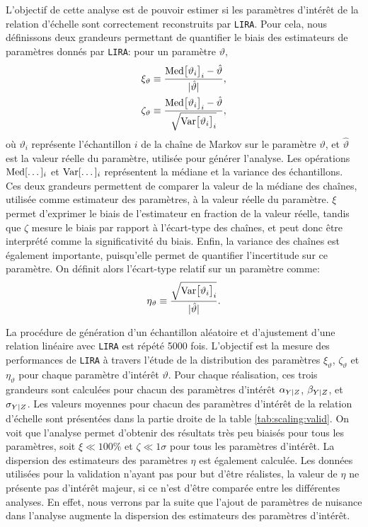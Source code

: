 L'objectif de cette analyse est de pouvoir estimer si les paramètres d'intérêt de la relation d'échelle sont correctement reconstruits par \texttt{LIRA}.
Pour cela, nous définissons deux grandeurs permettant de quantifier le biais des estimateurs de paramètres donnés par \texttt{LIRA}: pour un paramètre $\vartheta$,
\begin{align}
    \nonumber \xi_\vartheta &\equiv \frac{{\rm Med} \big[\vartheta_i\big]_i - \hat{\vartheta}}{|\hat{\vartheta}|}, \\
    \zeta_\vartheta &\equiv \frac{{\rm Med} \big[\vartheta_i\big]_i - \hat{\vartheta}}{\sqrt{{\rm Var}\big[\vartheta_i\big]_i}},
    \label{eq:scaling:xi_zeta}
\end{align}
où $\vartheta_i$ représente l'échantillon $i$ de la chaîne de Markov sur le paramètre $\vartheta$, et $\hat{\vartheta}$ est la valeur réelle du paramètre, utilisée pour générer l'analyse.
Les opérations ${\rm Med}[\dots]_i$ et ${\rm Var}[\dots]_i$ représentent la médiane et la variance des échantillons. \\
Ces deux grandeurs permettent de comparer la valeur de la médiane des chaînes, utilisée comme estimateur des paramètres, à la valeur réelle du paramètre.
$\xi$ permet d'exprimer le biais de l'estimateur en fraction de la valeur réelle, tandis que $\zeta$ mesure le biais par rapport à l'écart-type des chaînes, et peut donc être interprété comme la significativité du biais.
Enfin, la variance des chaînes est également importante, puisqu'elle permet de quantifier l'incertitude sur ce paramètre.
On définit alors l'écart-type relatif sur un paramètre comme:
\begin{equation}
    \label{eq:scaling:eta}
    \eta_\vartheta \equiv \frac{\sqrt{{\rm Var}\big[\vartheta_i\big]_i}}{|\hat{\vartheta}|}.
\end{equation}

La procédure de génération d'un échantillon aléatoire et d'ajustement d'une relation linéaire avec \texttt{LIRA} est répété 5000 fois.
L'objectif est la mesure des performances de \texttt{LIRA} à travers l'étude de la distribution des paramètres $\xi_\vartheta$, $\zeta_\vartheta$ et $\eta_\vartheta$ pour chaque paramètre d'intérêt $\vartheta$.
Pour chaque réalisation, ces trois grandeurs sont calculées pour chacun des paramètres d'intérêt $\alpha_{Y|Z}$, $\beta_{Y|Z}$, et $\sigma_{Y|Z}$.
Les valeurs moyennes pour chacun des paramètres d'intérêt de la relation d'échelle sont présentées dans la partie droite de la table \ref{tab:scaling:valid}.
On voit que l'analyse permet d'obtenir des résultats très peu biaisés pour tous les paramètres, soit $\xi \ll 100$\% et $\zeta \ll 1\sigma$ pour tous les paramètres d'intérêt.
La dispersion des estimateurs des paramètres $\eta$ est également calculée.
Les données utilisées pour la validation n'ayant pas pour but d'être réalistes, la valeur de $\eta$ ne présente pas d'intérêt majeur, si ce n'est d'être comparée entre les différentes analyses.
En effet, nous verrons par la suite que l'ajout de paramètres de nuisance dans l'analyse augmente la dispersion des estimateurs des paramètres d'intérêt.

